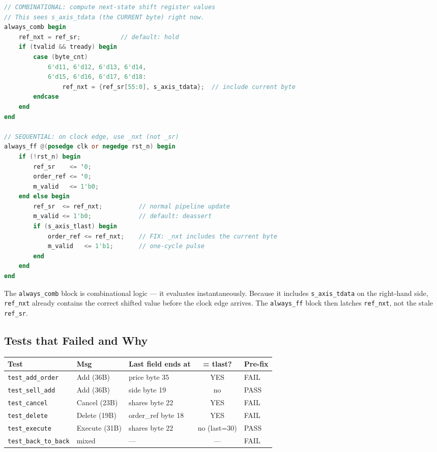 \documentclass[11pt,a4paper]{article}
\begin{document}
\begin{lstlisting}[language=Verilog,
  caption={Combinational \_nxt fix --- the core pattern in itch\_parser.sv}]
// COMBINATIONAL: compute next-state shift register values
// This sees s_axis_tdata (the CURRENT byte) right now.
always_comb begin
    ref_nxt = ref_sr;           // default: hold
    if (tvalid && tready) begin
        case (byte_cnt)
            6'd11, 6'd12, 6'd13, 6'd14,
            6'd15, 6'd16, 6'd17, 6'd18:
                ref_nxt = {ref_sr[55:0], s_axis_tdata};  // include current byte
        endcase
    end
end

// SEQUENTIAL: on clock edge, use _nxt (not _sr)
always_ff @(posedge clk or negedge rst_n) begin
    if (!rst_n) begin
        ref_sr    <= '0;
        order_ref <= '0;
        m_valid   <= 1'b0;
    end else begin
        ref_sr  <= ref_nxt;          // normal pipeline update
        m_valid <= 1'b0;             // default: deassert
        if (s_axis_tlast) begin
            order_ref <= ref_nxt;    // FIX: _nxt includes the current byte
            m_valid   <= 1'b1;       // one-cycle pulse
        end
    end
end
\end{lstlisting}

The \texttt{always\_comb} block is combinational logic --- it evaluates
instantaneously. Because it includes \texttt{s\_axis\_tdata} on the right-hand
side, \texttt{ref\_nxt} already contains the correct shifted value before the
clock edge arrives. The \texttt{always\_ff} block then latches \texttt{ref\_nxt},
not the stale \texttt{ref\_sr}.

\subsection{Tests that Failed and Why}

\begin{center}
\small
\begin{tabular}{l l l c l}
\toprule
\textbf{Test} & \textbf{Msg} & \textbf{Last field ends at} & \textbf{= tlast?} & \textbf{Pre-fix} \\
\midrule
\rowcolor{bugred!18}
\texttt{test\_add\_order}     & Add (36B)    & price byte 35      & YES & FAIL \\
\rowcolor{fixgreen!18}
\texttt{test\_sell\_add}      & Add (36B)    & side byte 19       & no  & PASS \\
\rowcolor{bugred!18}
\texttt{test\_cancel}         & Cancel (23B) & shares byte 22     & YES & FAIL \\
\rowcolor{bugred!18}
\texttt{test\_delete}         & Delete (19B) & order\_ref byte 18 & YES & FAIL \\
\rowcolor{fixgreen!18}
\texttt{test\_execute}        & Execute (31B) & shares byte 22    & no (last=30) & PASS \\
\rowcolor{bugred!18}
\texttt{test\_back\_to\_back} & mixed        & ---                & ---          & FAIL \\
\bottomrule
\end{tabular}
\end{center}
\end{document}
